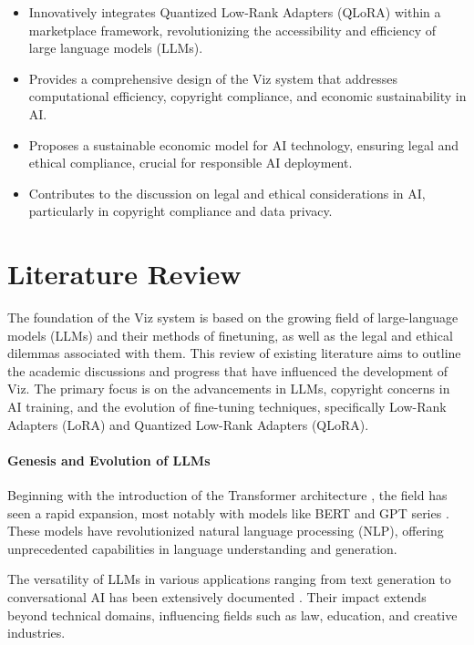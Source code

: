 \documentclass{article}
\begin{document}
\begin{itemize}
    \item Innovatively integrates Quantized Low-Rank Adapters (QLoRA) within a marketplace framework, revolutionizing the accessibility and efficiency of large language models (LLMs).
    \item Provides a comprehensive design of the Viz system that addresses computational efficiency, copyright compliance, and economic sustainability in AI.
    \item Proposes a sustainable economic model for AI technology, ensuring legal and ethical compliance, crucial for responsible AI deployment.
    \item Contributes to the discussion on legal and ethical considerations in AI, particularly in copyright compliance and data privacy.
\end{itemize}


\section{Literature Review}

The foundation of the Viz system is based on the growing field of large-language models (LLMs) and their methods of finetuning, as well as the legal and ethical dilemmas associated with them. This review of existing literature aims to outline the academic discussions and progress that have influenced the development of Viz. The primary focus is on the advancements in LLMs, copyright concerns in AI training, and the evolution of fine-tuning techniques, specifically Low-Rank Adapters (LoRA) and Quantized Low-Rank Adapters (QLoRA).

\paragraph{Genesis and Evolution of LLMs} Beginning with the introduction of the Transformer architecture \citep{vaswani2023attention}, the field has seen a rapid expansion, most notably with models like BERT \citep{devlin2019bert} and GPT series \citep{Radford2019LanguageMA}\citep{brown2020language}. These models have revolutionized natural language processing (NLP), offering unprecedented capabilities in language understanding and generation.

The versatility of LLMs in various applications ranging from text generation to conversational AI has been extensively documented \citep{wolf2020huggingfaces}. Their impact extends beyond technical domains, influencing fields such as law, education, and creative industries.
\end{document}
